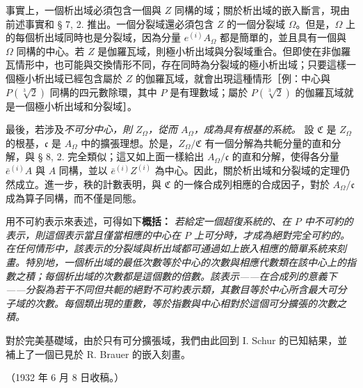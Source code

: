\documentclass[11pt]{article}
\providecommand{\srcspaced}[1]{#1}
\begin{document}
事實上，一個析出域必須包含一個與 \(Z\) 同構的域；關於析出域的嵌入斷言，現由前述事實和 § 7, 2. 推出。一個分裂域還必須包含 \(Z\) 的一個分裂域 \(\Omega\)。但是，\(\Omega\) 上的每個析出域同時也是分裂域，因為分量 \(e^{(i)}A_\Omega\) 都是簡單的，並且具有一個與 \(\Omega\) 同構的中心。若 \(Z\) 是伽羅瓦域，則極小析出域與分裂域重合。但即使在非伽羅瓦情形中，也可能與交換情形不同，存在同時為分裂域的極小析出域；只要這樣一個極小析出域已經包含屬於 \(Z\) 的伽羅瓦域，就會出現這種情形［例：中心與 \(P(\sqrt[3]{2})\) 同構的四元數除環，其中 \(P\) 是有理數域；屬於 \(P(\sqrt[3]{2})\) 的伽羅瓦域就是一個極小析出域和分裂域］。

最後，若涉及\emph{不可分中心，則 \(Z_\Omega\)，從而 \(A_\Omega\)，成為具有根基的系統。} 設 \(\mathfrak C\) 是 \(Z_\Omega\) 的根基，\(\mathfrak c\) 是 \(A_\Omega\) 中的擴張理想。於是，\(Z_\Omega/\mathfrak C\) 有一個分解為共軛分量的直和分解，與 § 8, 2. 完全類似；這又如上面一樣給出 \(A_\Omega/\mathfrak c\) 的直和分解，使得各分量 \(\bar e^{(i)}A\) 與 \(A\) 同構，並以 \(\bar e^{(i)}Z^{(i)}\) 為中心。因此，關於析出域和分裂域的定理仍然成立。進一步，秩的計數表明，與 \(\mathfrak C\) 的一條合成列相應的合成因子，對於 \(A_\Omega/\mathfrak c\) 成為算子同構，而不僅是同態。

用不可約表示來表述，可得如下\textbf{\srcspaced{概括：}} \emph{若給定一個超復系統的、在 \(P\) 中不可約的表示，則這個表示當且僅當相應的中心在 \(P\) 上可分時，才成為絕對完全可約的。在任何情形中，該表示的分裂域與析出域都可通過如上嵌入相應的簡單系統來刻畫。特別地，一個析出域的最低次數等於中心的次數與相應代數類在該中心上的指數之積；每個析出域的次數都是這個數的倍數。該表示——在合成列的意義下——分裂為若干不同但共軛的絕對不可約表示類，其數目等於中心所含最大可分子域的次數。每個類出現的重數，等於指數與中心相對於這個可分擴張的次數之積。}

對於完美基礎域，由於只有可分擴張域，我們由此回到 I. Schur 的已知結果，並補上了一個已見於 R. Brauer 的嵌入刻畫。

\begin{center}
（1932 年 6 月 8 日收稿。）
\end{center}

\clearpage

\setcounter{footnote}{0}
\end{document}
